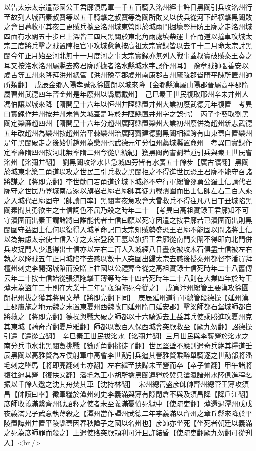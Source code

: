 以告太宗太宗遣彭國公王君廓領馬軍一千五百騎入洺州經十許日黑闥引兵攻洺州行至故列人城西秦叔寶等以五千騎擊之叔寶等為闥所敗又以伏兵從河下起横擊黑闥敗之會日暮收軍其夜三更賊兵摠至洺州城東營即於城兩門掘壕豎柵防王廓之走洺州城四面有水闊五十步已上深皆三四尺黑闥於東北角兩處填柴運土作甬道以撞車攻城太宗三度將兵擊之賊置陣拒官軍攻城愈急按高祖太宗實録皆以去年十二月命太宗討黑闥今年正月始至河北無十一月度河之事太宗實録亦無列人戰事蓋叔寶破賊秦王奏之耳又按洺水洺州屬縣去惑君廓所據者洺水縣城水字誤作州耳】　豫章賊帥張善安以䖍吉等五州來降拜洪州總管【洪州豫章郡䖍州南康郡吉州廬陵郡皆隋平陳所置州帥所類翻】　戊辰金鄉人陽孝誠叛徐圓朗以城來降【金鄉縣漢屬山陽郡晉屬高平郡隋屬曹州武德四年晉金州是年廢州以縣屬戴州】　己巳秦王世民復取邢州辛未井州人馮伯讓以城來降【隋開皇十六年以恒州井陘縣置井州大業初廢武德元年復置　考異曰實録作并州按并州未嘗失城蓋是時於井陘縣置井州字之誤也】　丙子李藝取劉黑闥定欒亷趙四州【隋開皇十六年分趙州廣阿縣置欒州大業初州廢併為趙州新志武德五年改趙州為欒州按趙州治平棘欒州治廣阿竇建德劉黑闥相繼跨有山東蓋自置欒州是年黑闥破走之後始併趙州為欒州也武德元年分恒州藁城縣置亷州　考異曰實録作定率亷隋四州按河北無率隋二州今從唐統紀】獲黑闥尚書劉希道引兵與秦王世民會洺州【洺彌并翻】　劉黑闥攻洺水甚急城四旁皆有水廣五十餘步【廣古曠翻】黑闥於城東北築二甬道以攻之世民三引兵救之黑闥拒之不得進世民恐王君廓不能守召諸將謀之【將即亮翻】李世勣曰若甬道達城下城必不守行軍總管郯勇公羅士信請代君廓守之世民乃登城南高冢以旗招君廓君廓帥其徒力戰潰圍而出士信帥左右二百人乘之入城代君廓固守【帥讀曰率】黑闥晝夜急攻會大雪救兵不得往凡八日丁丑城陷黑闥素聞其勇欲生之士信詞色不屈乃殺之時年二十　【考異曰高祖實録王君廓知不可守潰圍而出秦王謂諸將曰誰能代者士信曰願以死守因遣之按君廓若已潰圍而出則黑闥圍守益固士信何以復得入城革命記曰太宗知賊勢盛恐王君廓不能固以問諸將士信以為無慮太宗使士信入守之太宗登段王墓以旗招王君廓從南門突闈不得即向北門併兵攻捉門人少退得出士信亦以左右二百人入城經八日晝夜被攻木石俱盡士信被左右執之以降賊五年正月城陷李去惑以數十人突圍出歸太宗去惑後授秦州都督李潘買拜檀州刺史李開弼城陷而没贈上柱國以公禮葬今從之高祖實録士信死時年二十八舊傳云年二十按士信始從張須陁擊王薄等時年十四若死時年二十八則在大業四年於時王薄未為盜年二十則在大業十二年是歲須陁死今從之】　戊寅汴州總管王要漢攻徐圓朗杞州拔之獲其將周文舉【將即亮翻下同】　庚辰延州道行軍總管段德操【延州漢上郡膚施之地元魏之末置東夏州西魏改曰延州隋曰延安郡】擊梁師都石堡城師都自將救之【將即亮翻】德操與戰大破之師都以十六騎遁去上益其兵使乘勝進攻夏州克其東城【騎奇寄翻夏戶雅翻】師都以數百人保西城會突厥救至【厥九勿翻】詔德操引還【還從宣翻】　辛巳秦王世民拔洺水【洺彌并翻】三月世民與李藝營於洺水之南分兵屯水北黑闥數挑戰【數所角翻挑徒了翻】世民堅壁不應别遣奇兵絶其糧道壬辰黑闥以高雅賢為左僕射軍中高會李世勣引兵逼其營雅賢乘醉單騎逐之世勣部將潘毛刺之墜馬【將即亮翻刺七亦翻】左右繼至扶歸未至營而卒【卒子恤翻】甲午諸將復往逼其營【復扶又翻】潘毛為王小胡所擒黑闥運糧於冀貝滄瀛諸州水陸俱進程名振以千餘人邀之沈其舟焚其車【沈持林翻】　宋州總管盛彦師帥齊州總管王薄攻須昌【帥讀曰率】徵軍糧於潭州刺史李義滿與薄有隙閉倉不與及須昌降【降戶江翻】彦師收義滿繫齊州獄詔釋之使者未至義滿憂憤死獄中【使疏吏翻】薄還過潭州戊戌夜義滿兄子武意執薄殺之【潭州當作譚州武德二年李義滿以齊州之章丘縣來降於平陵置譚州并置平陵縣蓋因春秋譚子之國以名州也】彦師亦坐死【坐死者朝廷以義滿之死為彦師罪而殺之】上遣使賂突厥頡利可汗且許結昏【使疏吏翻厥九勿翻可從刋入】<br />
